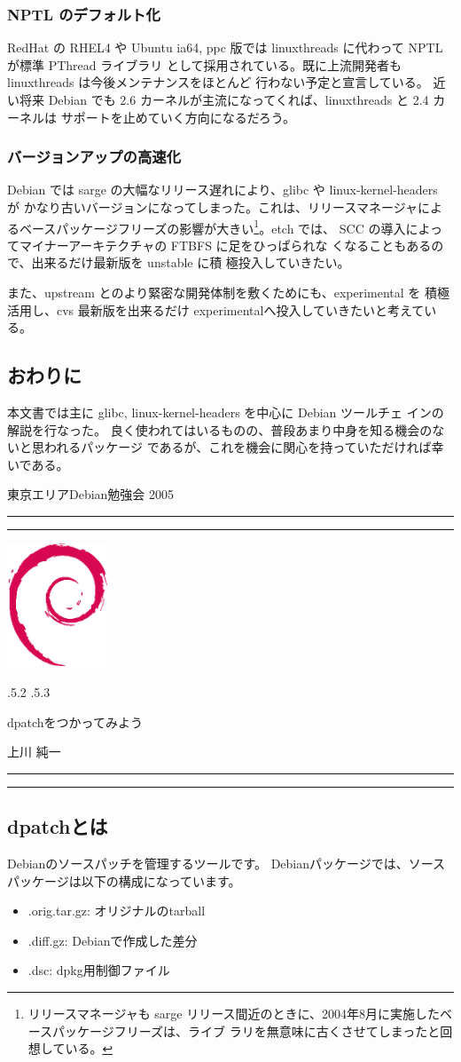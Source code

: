 \documentclass[mingoth]{jsarticle}
\makeatletter
\renewcommand{\section}{\@startsection{section}{1}{\z@}%
    {\Cvs \@plus.5\Cdp \@minus.2\Cdp}%
    {.5\Cvs \@plus.3\Cdp}%
    {\normalfont\Large\headfont\raggedright\centering}} %
\newcommand{\dancersection}[2]{%
\newpage
東京エリアDebian勉強会 2005
\hrule
\vspace{0.5mm}
\hrule
\hfill{}\includegraphics[width=3cm]{image200502/openlogo-nd.eps}\\
\vspace{-4cm}
\begin{center}
  \section{#1}
\end{center}
\hfill{}#2\hspace{3cm}\space\\
\hrule
\hrule
\vspace{1cm}
}
\makeatother
\begin{document}
  \subsubsection{NPTL のデフォルト化}

    RedHat の RHEL4 や Ubuntu ia64, ppc 版では linuxthreads に代わって
    NPTL が標準 PThread ライブラリ
    として採用されている。既に上流開発者も linuxthreads は今後メンテナンスをほとんど
    行わない予定と宣言している。
    近い将来 Debian でも 2.6 カーネルが主流になってくれば、linuxthreads と 2.4 カーネルは
    サポートを止めていく方向になるだろう。

  \subsubsection{バージョンアップの高速化}

    Debian では sarge の大幅なリリース遅れにより、glibc や linux-kernel-headers が
    かなり古いバージョンになってしまった。これは、リリースマネージャによ
    るベースパッケージフリーズの影響が大きい\footnote{リリースマネージャも sarge 
    リリース間近のときに、2004年8月に実施したベースパッケージフリーズは、ライブ
    ラリを無意味に古くさせてしまったと回想している。}。etch では、
    SCC の導入によってマイナーアーキテクチャの FTBFS に足をひっぱられな
    くなることもあるので、出来るだけ最新版を unstable に積
    極投入していきたい。

    また、upstream とのより緊密な開発体制を敷くためにも、experimental を
    積極活用し、cvs 最新版を出来るだけ experimentalへ投入していきたいと考えている。

\subsection{おわりに}

  本文書では主に glibc, linux-kernel-headers を中心に Debian ツールチェ
  インの解説を行なった。
  良く使われてはいるものの、普段あまり中身を知る機会のないと思われるパッケージ
  であるが、これを機会に関心を持っていただければ幸いである。

\dancersection{dpatchをつかってみよう}{上川 純一}
\label{sec:dpatch}

\subsection{dpatchとは}

 Debianのソースパッチを管理するツールです。 Debianパッケージでは、ソースパッケージは以下の構成になっています。
\begin{itemize}
    \item .orig.tar.gz: オリジナルのtarball
    \item .diff.gz: Debianで作成した差分
    \item .dsc: dpkg用制御ファイル
\end{itemize}
\end{document}
